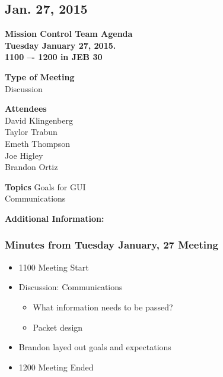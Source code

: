 \documentclass[pdftex,11pt]{article}
\begin{document}
\clearpage


\subsection{Jan. 27, 2015}
{ \huge \bfseries Mission Control Team Agenda \\[0.4cm] }
{ \huge \bfseries Tuesday January 27, 2015.\\1100 –-  1200  in JEB 30\\[0.4cm] }
\vspace*{2.5mm}

{ \large \bfseries \hspace*{2 mm} Type of Meeting\\}
\hspace*{12 mm}  Discussion
\vspace*{1.5mm}

{ \large \bfseries \hspace*{2 mm} Attendees\\}
\hspace*{12mm} David Klingenberg\\
\hspace*{12mm} Taylor Trabun\\
\hspace*{12mm} Emeth Thompson\\
\hspace*{12mm} Joe Higley\\
\hspace*{12mm} Brandon Ortiz\\
\vspace*{1.5mm}

{ \large \bfseries \noindent Topics}
\hspace*{12mm} Goals for GUI\\
\hspace*{12mm} Communications\\
\vspace*{2.5mm}

\vspace*{2.5mm}
{ \large \bfseries \noindent Additional Information:}

\subsubsection[short]{Minutes from Tuesday January, 27 Meeting}
\begin{itemize}
	\item 1100 \indent Meeting Start
	\item Discussion: Communications
	\begin{itemize}
		\item What information needs to be passed?
		\item Packet design 
	\end{itemize}	
	\item Brandon layed out goals and expectations
	\item 1200 \indent Meeting Ended
\end{itemize}	
\end{document}
